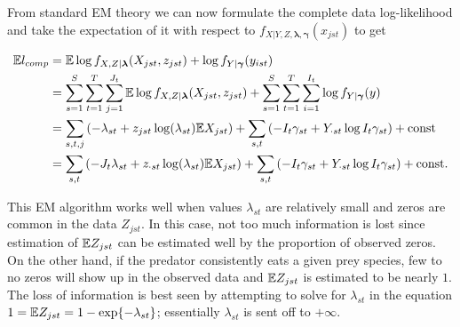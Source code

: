 \noindent From standard EM theory we can now formulate the complete data log-likelihood and take the expectation of it with respect to $f_{X|Y,Z,\boldsymbol{\lambda},\boldsymbol{\gamma}}(x_{jst})$ to get

\begin{align*}
  \mathbb{E} l_{comp} 
  & = \mathbb{E} \log{f_{X,Z|\boldsymbol{\lambda}}(X_{jst},z_{jst})} + \log{f_{Y|\boldsymbol{\gamma}}(y_{ist})} \\
  & = \sum_{s=1}^S \sum_{t=1}^T \sum_{j=1}^{J_t} \mathbb{E} \log{f_{X,Z|\boldsymbol{\lambda}}(X_{jst},z_{jst})}
  + \sum_{s=1}^S \sum_{t=1}^T \sum_{i=1}^{I_t} \log{f_{Y|\boldsymbol{\gamma}}(y)} \\
  & = \sum_{s,t,j} \left( - \lambda_{st} 
    + z_{jst} \log(\lambda_{st}) \mathbb{E} X_{jst} \right) + \sum_{s,t} \left( -I_t \gamma_{st} + Y_{\cdot st} \log{I_t \gamma_{st}} \right) + \text{const} \\
  & = \sum_{s,t} \left( -J_t \lambda_{st} + z_{\cdot st} \log(\lambda_{st}) \mathbb{E} X_{jst} \right) + \sum_{s,t} \left( -I_t \gamma_{st} + Y_{\cdot st} \log{I_t \gamma_{st}} \right) + \text{const}.
\end{align*}

This EM algorithm works well when values $\lambda_{st}$ are relatively small and zeros are common in the data $Z_{jst}$.  In this case, not too much information is lost since estimation of $\mathbb{E} Z_{jst}$ can be estimated well by the proportion of observed zeros.  On the other hand, if the predator consistently eats a given prey species, few to no zeros will show up in the observed data and $\mathbb{E} Z_{jst}$ is estimated to be nearly $1$.  The loss of information is best seen by attempting to solve for $\lambda_{st}$ in the equation $1 = \mathbb{E} Z_{jst} = 1 - \exp\{-\lambda_{st}\}$; essentially $\lambda_{st}$ is sent off to $+\infty$. 


